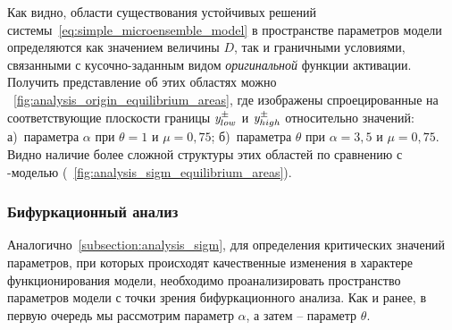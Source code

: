 Как видно, области существования устойчивых решений системы~\eqref{eq:simple_microensemble_model} в пространстве параметров модели определяются как значением величины $D$, так и граничными условиями, связанными с кусочно-заданным видом \textit{оригинальной} функции активации. Получить представление об этих областях можно \onfigure~\ref{fig:analysis_origin_equilibrium_areas}, где изображены спроецированные на соответствующие плоскости границы $\mathit{y}_{low}^{\pm}$ и $\mathit{y}_{high}^{\pm}$ относительно значений: а)~параметра $\alpha$ при $\theta = 1$ и $\mu = 0,75$; б)~параметра $\theta$ при $\alpha = 3,5$ и $\mu = 0,75$. Видно наличие более сложной структуры этих областей по сравнению с -моделью (\seefigure~\ref{fig:analysis_sigm_equilibrium_areas}). 


\subsubsection{Бифуркационный анализ}

Аналогично~\autoref{subsection:analysis_sigm}, для определения критических значений параметров, при которых происходят качественные изменения в характере функционирования модели, необходимо проанализировать пространство параметров модели с точки зрения бифуркационного анализа. Как и ранее, в первую очередь мы рассмотрим параметр $\alpha$, а затем -- параметр $\theta$.

